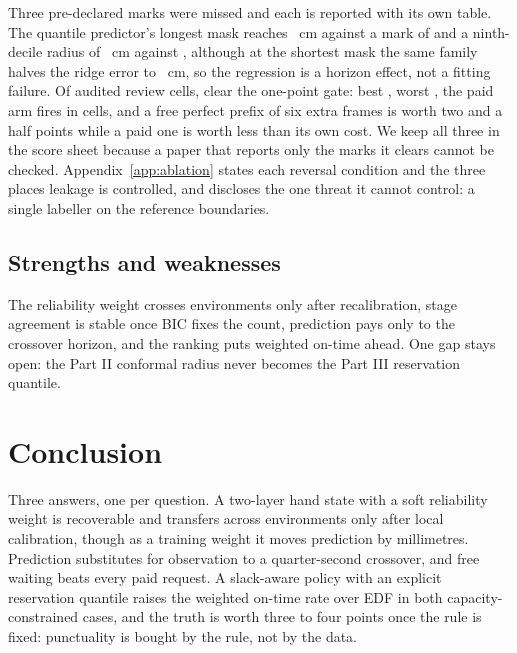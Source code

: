 \documentclass{swmcmthesis}
\begin{document}
Three pre-declared marks were missed and each is reported with its own table. The quantile
predictor's longest mask reaches \slotPQuantLThirtyRMSE{}~cm
against a mark of \slotPQuantLThirtyTarget{} and a ninth-decile radius of
\slotPQuantLThirtyQNineZero{}~cm against \slotPQuantLThirtyQNineZeroTarget{}, although at
the shortest mask the same family halves the ridge error to \slotPQuantLSixRMSE{}~cm, so the
regression is a horizon effect, not a fitting failure. Of \slotPRevNTested{} audited review
cells, \slotPRevNPass{} clear the one-point gate: best \slotPRevBest{}, worst
\slotPRevWorst{}, the paid arm fires in \slotPRevFired{} cells, and a free perfect prefix of
six extra frames is worth two and a half points while a paid one is worth less than its own
cost. We keep all three in the score sheet because a paper that reports only the marks it
clears cannot be checked. Appendix~\ref{app:ablation} states each reversal condition and the
three places leakage is controlled, and discloses the one threat it cannot control: a single
labeller on the reference boundaries.

\subsection{Strengths and weaknesses}

The reliability weight crosses environments only after recalibration, stage agreement is stable
once BIC fixes the count, prediction pays only to the crossover horizon, and the ranking puts weighted on-time ahead. One gap stays open: the Part II conformal radius never becomes the
Part III reservation quantile.

\section{Conclusion}
\label{sec:concl}

Three answers, one per question. A two-layer hand state with a soft reliability weight is
recoverable and transfers across environments only after local calibration, though as a
training weight it moves prediction by millimetres. Prediction substitutes for observation
to a quarter-second crossover, and free waiting beats every paid request. A slack-aware
policy with an explicit reservation quantile raises the weighted on-time rate over EDF in
both capacity-constrained cases, and the truth is worth three to four points once the rule
is fixed: punctuality is bought by the rule, not by the data.
\end{document}
